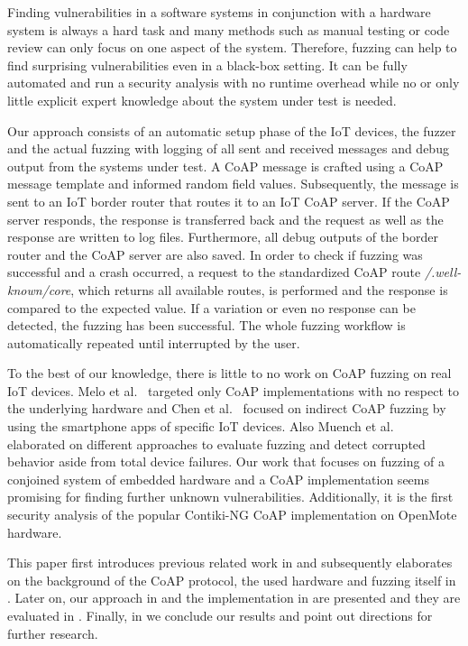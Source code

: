 Finding vulnerabilities in a software systems in conjunction with a hardware system is always a hard task and many methods such as manual testing or code review can only focus on one aspect of the system. Therefore, fuzzing can help to find surprising vulnerabilities even in a black-box setting. It can be fully automated and run a security analysis with no runtime overhead while no or only little explicit expert knowledge about the system under test is needed.

Our approach consists of an automatic setup phase of the IoT devices, the fuzzer and the actual fuzzing with logging of all sent and received messages and debug output from the systems under test. A CoAP message is crafted using a CoAP message template and informed random field values. Subsequently, the message is sent to an IoT border router that routes it to an IoT CoAP server. If the CoAP server responds, the response is transferred back and the request as well as the response are written to log files. Furthermore, all debug outputs of the border router and the CoAP server are also saved. In order to check if fuzzing was successful and a crash occurred, a request to the standardized CoAP route \textit{/.well-known/core}, which returns all available routes, is performed and the response is compared to the expected value. If a variation or even no response can be detected, the fuzzing has been successful. The whole fuzzing workflow is automatically repeated until interrupted by the user.

To the best of our knowledge, there is little to no work on CoAP fuzzing on real IoT devices. Melo et al.~\cite{Melo2017RobustnessTO} targeted only CoAP implementations with no respect to the underlying hardware and Chen et al.~\cite{chen2018ndss} focused on indirect CoAP fuzzing by using the smartphone apps of specific IoT devices. Also Muench et al.~\cite{EURECOM+5417} elaborated on different approaches to evaluate fuzzing and detect corrupted behavior aside from total device failures. Our work that focuses on fuzzing of a conjoined system of embedded hardware and a CoAP implementation seems promising for finding further unknown vulnerabilities. Additionally, it is the first security analysis of the popular Contiki-NG CoAP implementation on OpenMote hardware.

This paper first introduces previous related work in  and subsequently elaborates on the background of the CoAP protocol, the used hardware and fuzzing itself in . Later on, our approach in  and the implementation in  are presented and they are evaluated in . Finally, in  we conclude our results and point out directions for further research.
